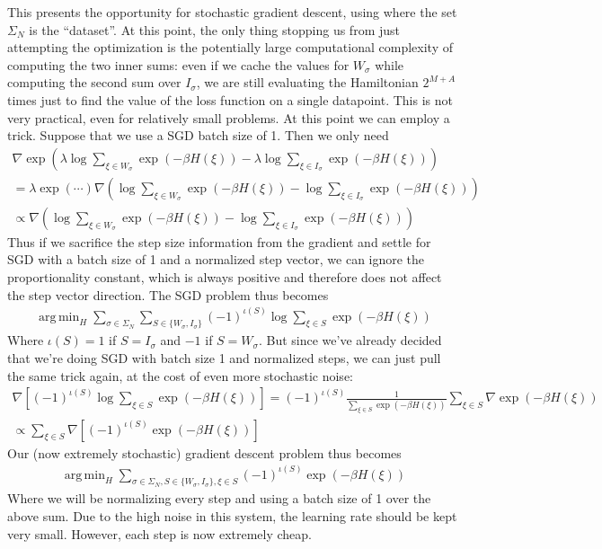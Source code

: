 \documentclass{article}
\DeclareMathOperator*{\argmin}{arg\,min}
\begin{document}
This presents the opportunity for stochastic gradient descent, using where the set $\Sigma_N$ is the ``dataset''. At this point, the only thing stopping us from just attempting the optimization is the potentially large computational complexity of computing the two inner sums: even if we cache the values for $W_\sigma$ while computing the second sum over $I_\sigma$, we are still evaluating the Hamiltonian $2^{M+A}$ times just to find the value of the loss function on a single datapoint. This is not very practical, even for relatively small problems. At this point we can employ a trick. Suppose that we use a SGD batch size of 1. Then we only need
\begin{align}
	\nabla \exp\left(\lambda\log \sum_{\xi \in W_\sigma} \exp(-\beta H(\xi)) - \lambda\log \sum_{\xi \in I_\sigma} \exp(-\beta H(\xi)) \right)\\
	= \lambda\exp\left(\cdots\right)\nabla\left(\log \sum_{\xi \in W_\sigma} \exp(-\beta H(\xi)) - \log \sum_{\xi \in I_\sigma} \exp(-\beta H(\xi)) \right)\\
	\propto \nabla\left(\log \sum_{\xi \in W_\sigma} \exp(-\beta H(\xi)) - \log \sum_{\xi \in I_\sigma} \exp(-\beta H(\xi)) \right)
\end{align}
Thus if we sacrifice the step size information from the gradient and settle for SGD with a batch size of 1 and a normalized step vector, we can ignore the proportionality constant, which is always positive and therefore does not affect the step vector direction. The SGD problem thus becomes
\begin{align}
\argmin_H \sum_{\sigma \in \Sigma_N} \sum_{S \in \{W_\sigma, I_\sigma\}} (-1)^{\iota(S)}\log \sum_{\xi \in S} \exp(-\beta H(\xi))
\end{align}
Where $\iota(S) = 1$ if $S = I_\sigma$ and $-1$ if $S = W_\sigma$. But since we've already decided that we're doing SGD with batch size 1 and normalized steps, we can just pull the same trick again, at the cost of even more stochastic noise:
\begin{align}
	\nabla \left[(-1)^{\iota(S)}\log \sum_{\xi \in S} \exp(-\beta H(\xi))\right] = (-1)^{\iota(S)} \frac{1}{\sum_{\xi \in S} \exp(-\beta H(\xi))} \sum_{\xi \in S} \nabla \exp(-\beta H(\xi))\\
	\propto  \sum_{\xi \in S} \nabla\left[(-1)^{\iota(S)} \exp(-\beta H(\xi))\right]
\end{align}
Our (now extremely stochastic) gradient descent problem thus becomes
\begin{align}
	\argmin_H \sum_{\sigma \in \Sigma_N, S \in \{W_\sigma, I_\sigma\}, \xi \in S} (-1)^{\iota(S)} \exp(-\beta H(\xi))
\end{align}
Where we will be normalizing every step and using a batch size of 1 over the above sum. Due to the high noise in this system, the learning rate should be kept very small. However, each step is now extremely cheap. 
\end{document}
